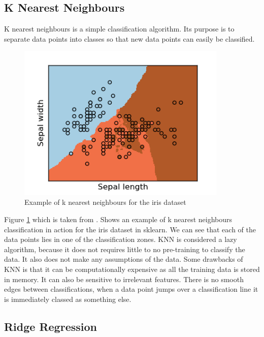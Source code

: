 \subsection*{K Nearest Neighbours}

K nearest neighbours is a simple classification algorithm. Its purpose is to separate data points into classes so that new data points can easily be classified.
\begin{figure}[H]
  \centering
  \includegraphics[scale=0.5,width=100mm]{./images/k-nearest-neighbours-example.png}
  \caption{Example of k nearest neighbours for the iris dataset}
  \label{fig:k-nearest-neighbours-example}
\end{figure}
Figure \ref{fig:k-nearest-neighbours-example} which is taken from \cite{kNearestNeighboursExample}. Shows an example of k nearest neighbours classification in action for the iris dataset in sklearn. We can see that each of the data points lies in one of the classification zones. KNN is considered a lazy algorithm, because it does not requires little to no pre-training to classify the data. It also does not make any assumptions of the data. Some drawbacks of KNN is that it can be computationally expensive as all the training data is stored in memory. It can also be sensitive to irrelevant features. There is no smooth edges between classifications, when a data point jumps over a classification line it is immediately classed as something else.

\subsection*{Ridge Regression}

